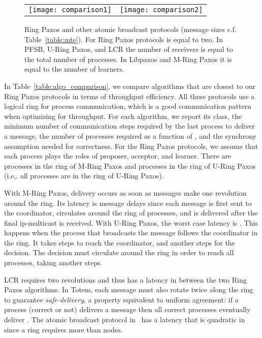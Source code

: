 \documentclass[final,3p,times,twocolumn,authoryear]{elsarticle}
\begin{document}
\begin{figure*}
  \begin{center}
    \begin{tabular}{c@{}c}
      \texttt{[image: comparison1]} &
      \texttt{[image: comparison2]} \\
    \end{tabular}
    \vspace{-3mm}
    \caption{Ring Paxos and other atomic broadcast protocols (message sizes c.f. Table~\ref{table:mte}). For Ring Paxos protocols  is equal to two. In PFSB, U-Ring Paxos, and LCR the number of receivers is equal to the total number of processes. In Libpaxos and M-Ring Paxos it is equal to the number of learners.}
  \label{fig:others}
  \end{center}
\end{figure*}



In Table~\ref{table:algo_comparison}, we compare algorithms that are closest to our Ring Paxos protocols in terms of throughput efficiency. All these protocols use a logical ring for process communication, which is a good communication pattern when optimizing for throughput. For each algorithm, we report its class, the minimum number of communication steps required by the last process to deliver a message, the number of processes required as a function of , and the synchrony assumption needed for correctness. For the Ring Paxos protocols, we assume that each process plays the roles of proposer, acceptor, and learner. There are  processes in the ring of M-Ring Paxos and  processes in the ring of U-Ring Paxos (i.e,. all processes are in the ring of U-Ring Paxos).

With M-Ring Paxos, delivery occurs as soon as messages make one revolution around the ring. Its latency is  message delays since each message is first sent to the coordinator, circulates around the ring of  processes, and is delivered after the final ip-multicast is received. With U-Ring Paxos, the worst case latency is . This happens when the process that broadcasts the message follows the coordinator in the ring. It takes  steps to reach the coordinator, and another  steps for the decision. The decision must circulate around the ring in order to reach all processes, taking another  steps.

LCR requires two revolutions and thus has a latency in between the two Ring Paxos algorithms. In Totem, each message must also rotate twice along the ring to guarantee \emph{safe-delivery}, a property equivalent to uniform agreement: if a process (correct or 
not) delivers a message  then all correct processes eventually deliver . 
The atomic broadcast protocol in~\cite{ESU04} has a latency that is quadratic in  since a ring requires more than  nodes.
\end{document}
